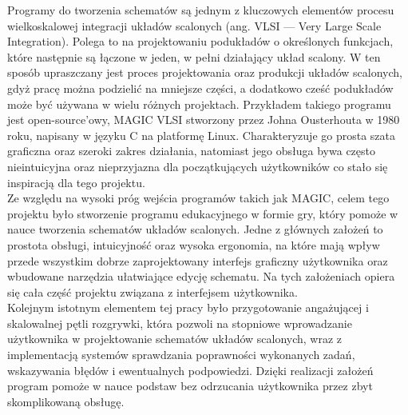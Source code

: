 Programy do tworzenia schematów są jednym z kluczowych elementów
procesu wielkoskalowej integracji układów scalonych (ang. VLSI — Very Large Scale Integration)\cite{VLSI}.
Polega to na projektowaniu podukładów o określonych funkcjach,
które następnie są łączone w jeden, w pełni działający układ scalony.
W ten sposób upraszczany jest proces projektowania oraz produkcji układów scalonych,
gdyż pracę można podzielić na mniejsze części,
a dodatkowo cześć podukładów może być używana w wielu różnych projektach.
Przykładem takiego programu jest open-source'owy, MAGIC VLSI stworzony przez Johna Ousterhouta w 1980 roku\cite{MAGIC},
napisany w języku C na platformę Linux\cite{MAGIC_wiki}.
Charakteryzuje go prosta szata graficzna oraz szeroki zakres działania,
natomiast jego obsługa bywa często nieintuicyjna oraz nieprzyjazna dla początkujących użytkowników
co stało się inspiracją dla tego projektu.\\
\indent Ze względu na wysoki próg wejścia programów takich jak MAGIC, celem tego projektu było stworzenie
programu edukacyjnego w formie gry, który pomoże w nauce tworzenia schematów układów scalonych.
%
Jedne z głównych założeń to prostota obsługi, intuicyjność oraz wysoka ergonomia,
na które mają wpływ przede wszystkim dobrze zaprojektowany interfejs graficzny użytkownika
oraz wbudowane narzędzia ułatwiające edycję schematu.
Na tych założeniach opiera się cała część projektu związana z interfejsem użytkownika.\\
%
\indent Kolejnym istotnym elementem tej pracy było przygotowanie angażującej i skalowalnej pętli rozgrywki,
która pozwoli na stopniowe wprowadzanie użytkownika w projektowanie schematów układów scalonych,
wraz z implementacją systemów sprawdzania poprawności wykonanych zadań, wskazywania błędów i ewentualnych podpowiedzi.
Dzięki realizacji założeń program pomoże w nauce podstaw bez odrzucania użytkownika
przez zbyt skomplikowaną obsługę.
